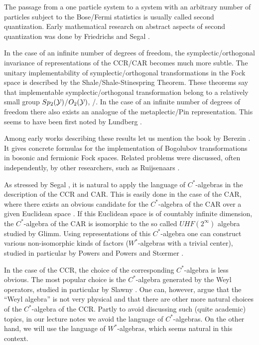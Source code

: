 \documentclass{svmult}
\def\cY{{\cal Y}}
\begin{document}
The passage from a  one particle system to a system with an arbitrary number of
 particles subject to the Bose/Fermi statistics is usually called second
 quantization. Early mathematical research on abstract aspects
 of second quantization was done by Friedrichs
\cite{Fr} and Segal \cite{Seg1,Seg2}.


 In the case of an infinite number of degrees of
freedom, 
the symplectic/orthogonal invariance of representations of the CCR/CAR
becomes much more subtle. The unitary implementability of symplectic/orthogonal transformations
in the Fock space is described by the Shale/Shale-Stinespring Theorem. These
theorems say 
 that implementable symplectic/orthogonal transformation belong to a
relatively small group $Sp_2(\cY)$/$O_2(\cY)$, \cite{Sh}/\cite{ShSt}.
In the case
of an infinite number 
of degrees of freedom 
there also exists  an analogue of the
 metaplectic/Pin representation. This seems to have been first noted
by Lundberg \cite{Lu}.

Among early works describing these results 
let us mention the book by Berezin \cite{Ber}. It gives
 concrete formulas for the implementation of Bogolubov
transformations in bosonic and fermionic Fock spaces. Related problems were
discussed, often independently, by other researchers, such as Ruijsenaars \cite{Ru1,Ru2}.







As stressed by Segal \cite{Seg2}, it is natural to apply
the language of $C^*$-algebras in the description of  the CCR and CAR.
 This is easily done in
the case of the
 CAR, where there exists an obvious candidate for the $C^*$-algebra
of the CAR over a given Euclidean space \cite{BR2}. If  this Euclidean space is of countably 
infinite 
dimension, the $C^*$-algebra of the CAR is isomorphic to the so called
$UHF(2^\infty)$ algebra studied by Glimm.
 Using representations of this $C^*$-algebra one can construct
 various non-isomorphic kinds of
factors ($W^*$-algebras with a trivial center),
 studied in particular by Powers \cite{Po} and Powers and St{\oe}rmer
\cite{PoSt}. 

In the case of the CCR, the choice of the corresponding
 $C^*$-algebra is less obvious. The most
popular choice is the $C^*$-algebra generated by the Weyl operators, studied
in particular by Slawny \cite{Sla}. One can, however, argue that the ``Weyl
algebra'' is not very physical and that there are other more natural choices
of the $C^*$-algebra of the CCR.
Partly to avoid discussing such (quite academic) topics, 
 in our lecture notes
we avoid the language of $C^*$-algebras. On the other hand, we will use the
language of $W^*$-algebras, which seems  natural in this context.
\end{document}
